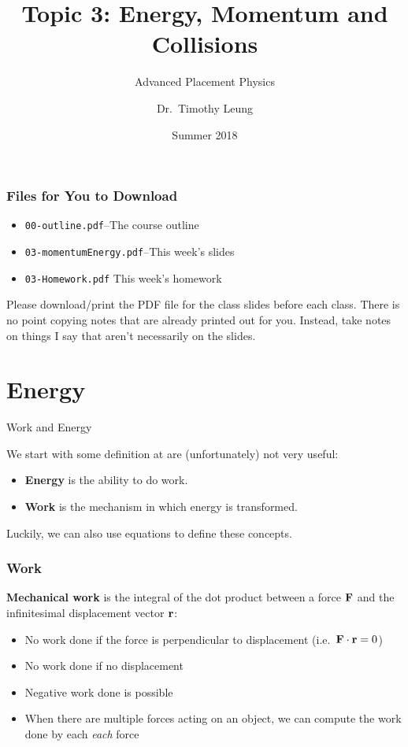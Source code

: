 \documentclass[12pt,compress,aspectratio=169]{beamer}
\title{Topic 3: Energy, Momentum and Collisions}
\subtitle{Advanced Placement Physics}
\author[TML]{Dr.\ Timothy Leung}
\institute{Olympiads School}
\date{Summer 2018}
\newcommand{\mb}[1]{\ensuremath\mathbf{#1}}
\newcommand{\eq}[2]{\vspace{#1}{\Large\begin{displaymath}#2\end{displaymath}}}
\begin{document}
\begin{frame}
  \maketitle
\end{frame}

\begin{frame}
  \frametitle{Files for You to Download}
  \begin{itemize}
  \item\texttt{00-outline.pdf}--The course outline
  \item\texttt{03-momentumEnergy.pdf}--This week's slides
  \item\texttt{03-Homework.pdf} This week's homework
  \end{itemize}
  Please download/print the PDF file for the class slides before each class.
  There is no point copying notes that are already printed out for you.
  Instead, take notes on things I say that aren't necessarily on the slides.
\end{frame}



\section{Energy}

\begin{frame}{Work and Energy}

  We start with some definition at are (unfortunately) not very useful:

  \begin{itemize}
    \item \textbf{Energy} is the ability to do work.
    \item \textbf{Work} is the mechanism in which energy is transformed.
  \end{itemize}
  
  Luckily, we can also use equations to define these concepts.
\end{frame}


\begin{frame}
  \frametitle{Work}
  \textbf{Mechanical work} is the integral of the dot product between a force
  $\mb{F}$ and the infinitesimal displacement vector $\mb{r}$:

  \eq{-.2in}{
    \boxed{W=\int_{r_1}^{r_2}\mb{F}(r)\cdot d\mb{r}}
  }

  \begin{itemize}
  \item No work done if the force is perpendicular to displacement
    (i.e.\ $\mb{F}\cdot\mb{r}=0$)
  \item No work done if no displacement
  \item Negative work done is possible
  \item When there are multiple forces acting on an object, we can compute the
    work done by each \emph{each} force
  \end{itemize}
\end{frame}
\end{document}
